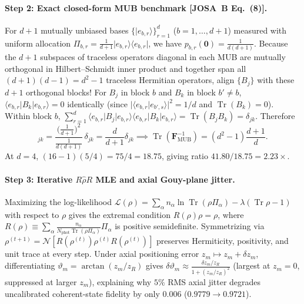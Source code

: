\documentclass[10pt,letterpaper]{article}
\newcommand{\braket}[2]{\langle #1 | #2 \rangle}
\newcommand{\ket}[1]{\lvert #1 \rangle}
\newcommand{\bra}[1]{\langle #1 \rvert}
\newcommand{\abs}[1]{\lvert #1 \rvert}
\newcommand{\josb}[1]{\textbf{[JOSA~B Eq.~(#1)]}}
\numberwithin{equation}{section}
\begin{document}
\paragraph*{Step 2: Exact closed-form MUB benchmark \josb{8}.}
For $d+1$ mutually unbiased bases $\{\ket{e_{b,r}}\}_{r=1}^d$ ($b = 1,\dots,d+1$) measured with uniform allocation $\Pi_{b,r} = \frac{1}{d+1}\ket{e_{b,r}}\bra{e_{b,r}}$, we have $p_{b,r}(\mathbf{0}) = \frac{1}{d(d+1)}$. Because the $d+1$ subspaces of traceless operators diagonal in each MUB are mutually orthogonal in Hilbert--Schmidt inner product and together span all $(d+1)(d-1) = d^2 - 1$ traceless Hermitian operators, align $\{B_j\}$ with these $d+1$ orthogonal blocks! For $B_j$ in block $b$ and $B_k$ in block $b' \neq b$, $\bra{e_{b,r}}B_k\ket{e_{b,r}} = 0$ identically (since $\abs{\braket{e_{b,r}}{e_{b',s}}}^2 = 1/d$ and $\operatorname{Tr}(B_k) = 0$). Within block $b$, $\sum_{r=1}^d \bra{e_{b,r}}B_j\ket{e_{b,r}}\bra{e_{b,r}}B_k\ket{e_{b,r}} = \operatorname{Tr}(B_j B_k) = \delta_{jk}$. Therefore
\begin{equation}
  [\mathbf{F}_{\mathrm{MUB}}]_{jk} = \frac{\bigl(\frac{1}{d+1}\bigr)^2}{\frac{1}{d(d+1)}}\,\delta_{jk} = \frac{d}{d+1}\delta_{jk} \implies \operatorname{Tr}\!\left(\mathbf{F}_{\mathrm{MUB}}^{-1}\right) = (d^2 - 1)\frac{d+1}{d}.
\end{equation}
At $d = 4$, $(16-1)(5/4) = 75/4 = \mathbf{18.75}$, giving ratio $41.80/18.75 = \mathbf{2.23\times}$.

\paragraph*{Step 3: Iterative $R\hat{\rho}R$ MLE and axial Gouy-plane jitter.}
Maximizing the log-likelihood $\mathcal{L}(\rho) = \sum_\alpha n_\alpha \ln\operatorname{Tr}(\rho\Pi_\alpha) - \lambda(\operatorname{Tr}\rho - 1)$ with respect to $\rho$ gives the extremal condition $R(\rho)\rho = \rho$, where $R(\rho) \equiv \sum_\alpha \frac{n_\alpha}{N_{\mathrm{phot}} \operatorname{Tr}(\rho\Pi_\alpha)}\Pi_\alpha$ is positive semidefinite. Symmetrizing via $\rho^{(t+1)} = \mathcal{N}[R(\rho^{(t)})\rho^{(t)} R(\rho^{(t)})]$ preserves Hermiticity, positivity, and unit trace at every step. Under axial positioning error $z_m \mapsto z_m + \delta z_m$, differentiating $\vartheta_m = \arctan(z_m/z_R)$ gives $\delta\vartheta_m \approx \frac{\delta z_m/z_R}{1+(z_m/z_R)^2}$ (largest at $z_m = 0$, suppressed at larger $z_m$), explaining why $5\%$ RMS axial jitter degrades uncalibrated coherent-state fidelity by only $0.006$ ($0.9779 \to 0.9721$).
\end{document}
